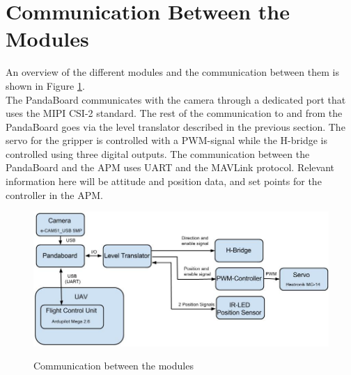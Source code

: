 \section{Communication Between the Modules}
An overview of the different modules and the communication between them is shown in Figure \ref{com}.\\
\newline
The PandaBoard communicates with the camera through a dedicated port that uses the MIPI CSI-2 standard. The rest of the communication to and from the PandaBoard goes via the level translator described in the previous section. The servo for the gripper is controlled with a PWM-signal while the H-bridge is controlled using three digital outputs. The communication between the PandaBoard and the APM uses UART and the MAVLink protocol. Relevant information here will be attitude and position data, and set points for the controller in the APM.
\begin{figure}[H]
\centering
\includegraphics[width = 12cm]{fig/krets/com.jpg}
\label{com}
\caption{Communication between the modules}
\end{figure}
